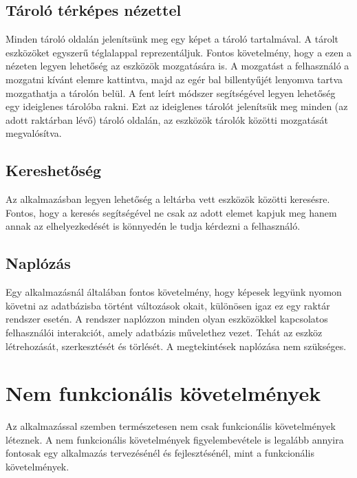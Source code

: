\subsection{Tároló térképes nézettel}
Minden tároló oldalán jelenítsünk meg egy képet a tároló tartalmával.
A tárolt eszközöket egyszerű téglalappal reprezentáljuk.
Fontos követelmény, hogy a ezen a nézeten legyen lehetőség az eszközök mozgatására is.
A mozgatást a felhasználó a mozgatni kívánt elemre kattintva, majd az egér bal billentyűjét lenyomva tartva mozgathatja a tárolón belül.
A fent leírt módszer segítségével legyen lehetőség egy ideiglenes tárolóba rakni. 
Ezt az ideiglenes tárolót jelenítsük meg minden (az adott raktárban lévő) tároló oldalán, az eszközök tárolók közötti mozgatását megvalósítva.

\subsection{Kereshetőség}
Az alkalmazásban legyen lehetőség a leltárba vett eszközök közötti keresésre.
Fontos, hogy a keresés segítségével ne csak az adott elemet kapjuk meg hanem annak az elhelyezkedését is könnyedén le tudja kérdezni a felhasználó.

\subsection{Naplózás}
Egy alkalmazásnál általában fontos követelmény, hogy képesek legyünk nyomon követni az adatbázisba történt változások okait, különösen igaz ez egy raktár rendszer esetén.
A rendszer naplózzon minden olyan eszközökkel kapcsolatos felhasználói interakciót, amely adatbázis művelethez vezet.
Tehát az eszköz létrehozását, szerkesztését és törlését. A megtekintések naplózása nem szükséges.

\section{Nem funkcionális követelmények}

Az alkalmazással szemben természetesen nem csak funkcionális követelmények léteznek.
A nem funkcionális követelmények figyelembevétele is legalább annyira fontosak egy alkalmazás tervezésénél és fejlesztésénél, mint a funkcionális követelmények.

